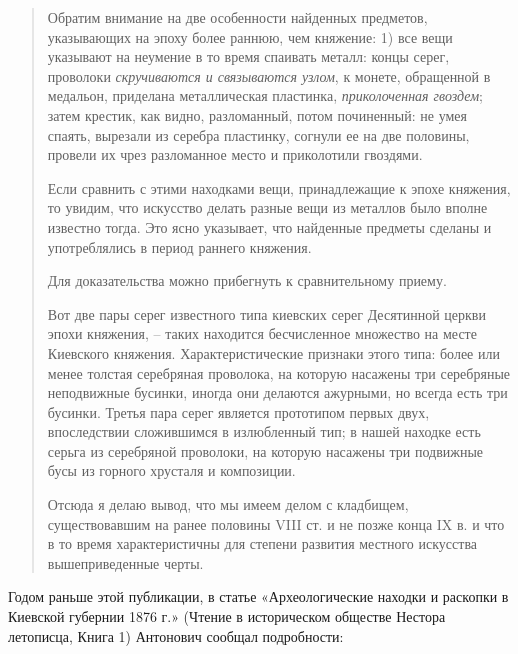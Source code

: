 \begin{quotation}
Обратим внимание на две особенности найденных предметов, указывающих на эпоху более раннюю, чем княжение: 1) все вещи указывают на неумение в то время спаивать металл: концы серег, проволоки \textit{скручиваются и связываются узлом}, к монете, обращенной в медальон, приделана металлическая пластинка, \textit{приколоченная гвоздем}; затем крестик, как видно, разломанный, потом починенный: не умея спаять, вырезали из серебра пластинку, согнули ее на две половины, провели их чрез разломанное место и приколотили гвоздями.

Если сравнить с этими находками вещи, принадлежащие к эпохе княжения, то увидим, что искусство делать разные вещи из металлов было вполне известно тогда. Это ясно указывает, что найденные предметы сделаны и употреблялись в период раннего княжения.

Для доказательства можно прибегнуть к сравнительному приему.

Вот две пары серег известного типа киевских серег Десятинной церкви эпохи княжения, – таких находится бесчисленное множество на месте Киевского княжения. Характеристические признаки этого типа: более или менее толстая серебряная проволока, на которую насажены три серебряные неподвижные бусинки, иногда они делаются ажурными, но всегда есть три бусинки. Третья пара серег является прототипом первых двух, впоследствии сложившимся в излюбленный тип; в нашей находке есть серьга из серебряной проволоки, на которую насажены три подвижные бусы из горного хрусталя и композиции. 

Отсюда я делаю вывод, что мы имеем делом с кладбищем, существовавшим на ранее половины VIII ст. и не позже конца IX в. и что в то время характеристичны для степени развития местного искусства вышеприведенные черты.
\end{quotation}

Годом раньше этой публикации, в статье «Археологические находки и раскопки в Киевской губернии 1876 г.» (Чтение в историческом обществе Нестора летописца, Книга 1) Антонович сообщал подробности:

